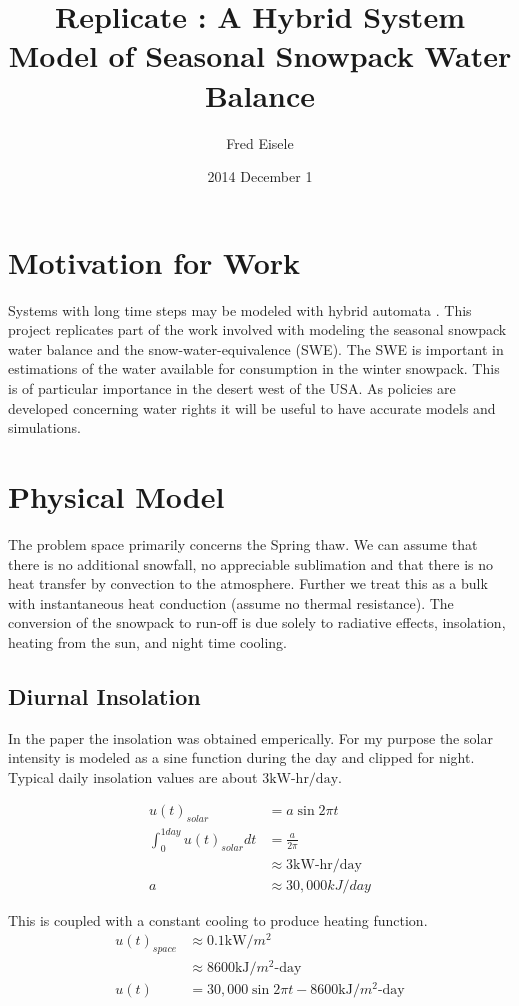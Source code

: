 \documentclass{article}
\title{Replicate : A Hybrid System Model of Seasonal Snowpack Water Balance}
\author{Fred Eisele }
\date{2014 December 1}
\begin{document}
\maketitle

\section{Motivation for Work}

Systems with long time steps may be modeled with hybrid automata
\citep{kerkez2010swb}.
This project replicates part of the work involved with modeling
the seasonal snowpack water balance and the snow-water-equivalence (SWE).
The SWE is important in estimations of the water available
for consumption in the winter snowpack.
This is of particular importance in the desert west of the USA.
As policies are developed concerning water rights it
will be useful to have accurate models and simulations.

\section{Physical Model}

The problem space primarily concerns the Spring thaw.
We can assume that there is no additional snowfall,
no appreciable sublimation and that there is no
heat transfer by convection to the atmosphere.
Further we treat this as a bulk with instantaneous
heat conduction (assume no thermal resistance).
The conversion of the snowpack to run-off is due solely
to radiative effects, insolation, heating from the sun,
and night time cooling.

\subsection{Diurnal Insolation}

In the paper the insolation was obtained emperically.
For my purpose the solar intensity is modeled as a sine
function during the day and clipped for night.
Typical daily insolation values are about $3 \text{kW-hr/day}$.

\begin{align}
u(t)_{solar} &= a \sin{2 \pi t} \\
\int_0^{1 day} u(t)_{solar} dt &= \frac{a}{2 \pi} \\
  &\approx 3 \text{kW-hr/day} \\
a &\approx 30,000 kJ/day
\end{align}

This is coupled with a constant cooling to produce heating function.
\begin{align}
u(t)_{space} &\approx 0.1 \text{kW/$m^2$} \\
   &\approx 8600 \text{kJ/$m^2$-day} \\
u(t) &= 30,000 \sin{2 \pi t} - 8600 \text{kJ/$m^2$-day}
  \label{equ:power}
\end{align}
\end{document}

